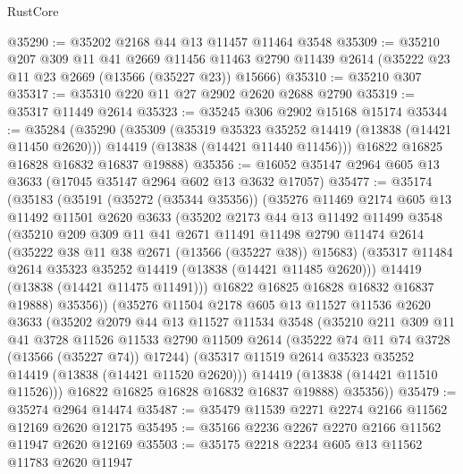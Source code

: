 \begin{lexlean}{RustCore}
\begin{coremodule}
@35290 := @35202 @2168 @44 @13 @11457 @11464 @3548
@35309 := @35210
    @207
    @309
    @11
    @41
    @2669
    @11456
    @11463
    @2790
    @11439
    @2614
    (@35222 @23 @11 @23 @2669 (@13566 (@35227 @23)) @15666)
@35310 := @35210 @307
@35317 := @35310 @220 @11 @27 @2902 @2620 @2688 @2790
@35319 := @35317 @11449 @2614
@35323 := @35245 @306 @2902 @15168 @15174
@35344 := @35284
    (@35290
      (@35309
        (@35319 @35323 @35252 @14419 (@13838 (@14421 @11450 @2620)))
        @14419
        (@13838 (@14421 @11440 @11456)))
      @16822
      @16825
      @16828
      @16832
      @16837
      @19888)
@35356 := @16052 @35147 @2964 @605 @13 @3633 (@17045 @35147 @2964 @602 @13 @3632 @17057)
@35477 := @35174
    (@35183
      (@35191
        (@35272 (@35344 @35356))
        (@35276
          @11469
          @2174
          @605
          @13
          @11492
          @11501
          @2620
          @3633
          (@35202
            @2173
            @44
            @13
            @11492
            @11499
            @3548
            (@35210
              @209
              @309
              @11
              @41
              @2671
              @11491
              @11498
              @2790
              @11474
              @2614
              (@35222 @38 @11 @38 @2671 (@13566 (@35227 @38)) @15683)
              (@35317 @11484 @2614 @35323 @35252 @14419 (@13838 (@14421 @11485 @2620)))
              @14419
              (@13838 (@14421 @11475 @11491)))
            @16822
            @16825
            @16828
            @16832
            @16837
            @19888)
          @35356))
      (@35276
        @11504
        @2178
        @605
        @13
        @11527
        @11536
        @2620
        @3633
        (@35202
          @2079
          @44
          @13
          @11527
          @11534
          @3548
          (@35210
            @211
            @309
            @11
            @41
            @3728
            @11526
            @11533
            @2790
            @11509
            @2614
            (@35222 @74 @11 @74 @3728 (@13566 (@35227 @74)) @17244)
            (@35317 @11519 @2614 @35323 @35252 @14419 (@13838 (@14421 @11520 @2620)))
            @14419
            (@13838 (@14421 @11510 @11526)))
          @16822
          @16825
          @16828
          @16832
          @16837
          @19888)
        @35356))
@35479 := @35274 @2964 @14474
@35487 := @35479 @11539 @2271 @2274 @2166 @11562 @12169 @2620 @12175
@35495 := @35166 @2236 @2267 @2270 @2166 @11562 @11947 @2620 @12169
@35503 := @35175 @2218 @2234 @605 @13 @11562 @11783 @2620 @11947

\end{coremodule}
\end{lexlean}
